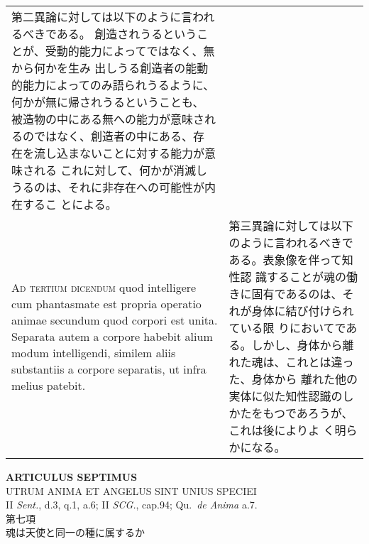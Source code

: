 \documentclass[paper=a4paper,fontsize=10pt,jafontsize=9pt,titlepage]{jlreq}
\begin{document}
\begin{longtable}{p{21em}p{21em}}
第二異論に対しては以下のように言われるべきである。
創造されうるということが、受動的能力によってではなく、無から何かを生み
 出しうる創造者の能動的能力によってのみ語られうるように、何かが無に帰されうるということも、
被造物の中にある無への能力が意味されるのではなく、創造者の中にある、存
 在を流し込まないことに対する能力が意味される
これに対して、何かが消滅しうるのは、それに非存在への可能性が内在するこ
 とによる。

\\



{\scshape Ad tertium dicendum} quod intelligere cum phantasmate est
propria operatio animae secundum quod corpori est unita. Separata
autem a corpore habebit alium modum intelligendi, similem aliis
substantiis a corpore separatis, ut infra melius patebit.


&

第三異論に対しては以下のように言われるべきである。表象像を伴って知性認
識することが魂の働きに固有であるのは、それが身体に結び付けられている限
りにおいてである。しかし、身体から離れた魂は、これとは違った、身体から
離れた他の実体に似た知性認識のしかたをもつであろうが、これは後によりよ
く明らかになる。


\\

\end{longtable}
\newpage

\begin{center}
{\Large {\bfseries ARTICULUS SEPTIMUS}}\\
{\large UTRUM ANIMA ET ANGELUS SINT UNIUS SPECIEI}\\
{\footnotesize II {\itshape Sent.}, d.3, q.1, a.6; II {\itshape SCG.},
 cap.94; Qu.~{\itshape de Anima} a.7.}\\
{\Large 第七項\\魂は天使と同一の種に属するか}
\end{center}
\end{document}
